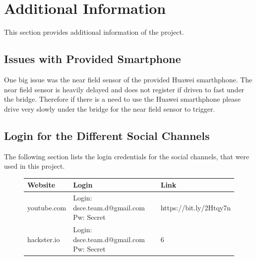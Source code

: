 \section{Additional Information}
This section provides additional information of the project. 

\subsection{Issues with Provided Smartphone}
One big issue was the near field sensor of the provided Huawei smarthphone. The near field sensor is heavily delayed and does not register if driven to fast under the bridge. Therefore if there is a need to use the Huawei smarthphone please drive very slowly under the bridge for the near field sensor to trigger. 

\subsection{Login for the Different Social Channels}
The following section lists the login credentials for the social channels, that were used in this project.
\begin{figure}[H]
	\centering
	\begin{tabular}{ l | p{5.6cm} | p{5.6cm} }
		Website & Login & Link \\ \hline
		youtube.com & Login: dsce.team.d@gmail.com Pw: Secret & https://bit.ly/2Htqy7n\\
		hackster.io & Login: dsce.team.d@gmail.com Pw: Secret & 6 \\
	\end{tabular}
\end{figure}
\newpage
